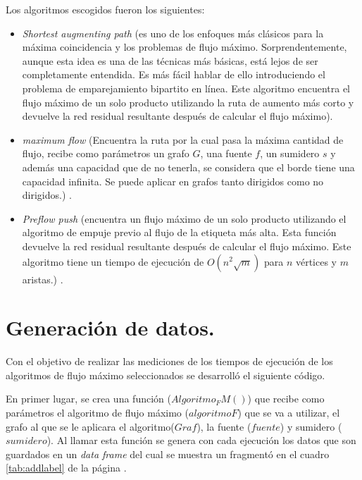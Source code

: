 \documentclass{article}
\begin{document}
Los algoritmos escogidos fueron los siguientes:
\begin{itemize}
  \item\textit{Shortest augmenting path} (es uno de los enfoques más clásicos para la máxima coincidencia y los problemas de flujo máximo. Sorprendentemente, aunque esta idea es una de las técnicas más básicas, está lejos de ser completamente entendida. Es más fácil hablar de ello introduciendo el problema de emparejamiento bipartito en línea\cite{Bosek2018}. Este algoritmo encuentra el flujo máximo de un solo producto utilizando la ruta de aumento más corto y devuelve la red residual resultante después de calcular el flujo máximo).   
   \item\textit{maximum flow} (Encuentra la ruta por la cual pasa la máxima cantidad de flujo, recibe como parámetros un grafo $G$, una fuente $f$, un sumidero $s$ y además una capacidad que de no tenerla, se considera que el borde tiene una capacidad infinita. Se puede aplicar en grafos tanto dirigidos como no dirigidos.) \cite{mf}.
	\item\textit{Preflow push} (encuentra un flujo máximo de un solo producto utilizando el algoritmo de empuje previo al flujo de la etiqueta más alta. Esta función devuelve la red residual resultante después de calcular el flujo máximo. Este algoritmo tiene un tiempo de ejecución de $ O(n^{2}\sqrt{m})$ para $n$ vértices y $m$ aristas.) \cite{gc}.
\end{itemize}
\section{Generación de datos.}
Con el objetivo de realizar las mediciones de los tiempos de ejecución de los algoritmos de flujo máximo seleccionados se desarrolló el siguiente código.

En primer lugar, se crea una función ($Algoritmo_FM()$) que recibe como parámetros el algoritmo de flujo máximo ($algoritmoF$) que se va a utilizar, el grafo al que se le aplicara el algoritmo($Graf$), la fuente ($fuente$) y sumidero ($sumidero$). Al llamar esta función se genera con cada ejecución los datos que son guardados en un \textit{data frame} del cual se muestra un fragmentó en el cuadro \ref{tab:addlabel} de la página \pageref{tab:addlabel}.

\begin{center}

\end{center}
\end{document}
